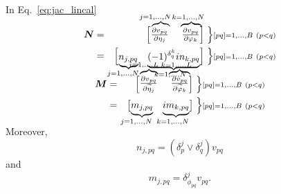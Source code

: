 \documentclass[useAMS,usenatbib]{mn2e}
\newcommand{\bN}{\bmath{N}}
\newcommand{\bM}{\bmath{M}}
\newcommand\coolover[2]{\mathrlap{\smash{\overbrace{\phantom{%
    \begin{matrix} #2 \end{matrix}}}^{\mbox{$#1$}}}}#2}
\newcommand\coolunder[2]{\mathrlap{\smash{\underbrace{\phantom{%
    \begin{matrix} #2 \end{matrix}}}_{\mbox{$#1$}}}}#2}
\newcommand\coolrightbrace[2]{%
\left.\vphantom{\begin{matrix} #1 \end{matrix}}\right\}#2}
\begin{document}
In Eq.~\eqref{eq:jac_lincal} 

\begin{eqnarray}
\bN &=& 
\begin{bmatrix}
\coolover{\!\!\!\!\!\!\!{\scriptstyle j=1,\ldots,N}}{\frac{\partial v_{pq}}{\partial \eta_j}} & \coolover{\!\!\!\!{\scriptstyle k=1,\ldots,N}}{~\frac{\partial v_{pq}}{\partial \varphi_k}}
\end{bmatrix}
\begin{matrix}%
\coolrightbrace{\frac{\partial v_{ij}}{\partial \eta_j}}{\scriptstyle [pq] = 1,\ldots,B~(p<q)}
\end{matrix}\\
&=& \begin{bmatrix}
\coolunder{\!\!\!\!\!\!\!{\scriptstyle j=1,\ldots,N}}{n_{j,pq}} & \coolunder{\!\!\!\!{\scriptstyle k=1,\ldots,N}}{(-1)^{\delta_q^k}i n_{k,pq}}
\end{bmatrix}
\begin{matrix}%
\coolrightbrace{\frac{\partial v_{ij}}{\partial \eta_j}}{\scriptstyle [pq] = 1,\ldots,B~(p<q)}
\end{matrix}\\
\end{eqnarray}

\begin{eqnarray}
\bM &=& 
\begin{bmatrix}
\coolover{\!\!\!\!\!\!\!{\scriptstyle j=1,\ldots,L}}{\frac{\partial v_{pq}}{\partial \widetilde{\eta}_j}} & \coolover{\!\!\!\!{\scriptstyle k=1,\ldots,L}}{~\frac{\partial v_{pq}}{\partial \widetilde{\varphi}_k}}
\end{bmatrix}
\begin{matrix}%
\coolrightbrace{\frac{\partial v_{ij}}{\partial \eta_j}}{\scriptstyle [pq] = 1,\ldots,B~(p<q)}
\end{matrix}\\
&=& \begin{bmatrix}
\coolunder{\!\!\!\!\!\!\!{\scriptstyle j=1,\ldots,N}}{m_{j,pq}} & \coolunder{\!\!\!\!{\scriptstyle k=1,\ldots,N}}{i m_{k,pq}}
\end{bmatrix}
\begin{matrix}%
\coolrightbrace{\frac{\partial v_{ij}}{\partial \eta_j}}{\scriptstyle [pq] = 1,\ldots,B~(p<q)}
\end{matrix}\\
\end{eqnarray}

Moreover,
\begin{equation}
n_{j,pq} = (\delta_{p}^{j}\vee\delta_{q}^{j}) v_{pq} 
\end{equation}
and
\begin{equation}
m_{j,pq} = \delta_{\phi_{pq}}^{j} v_{pq}.
\end{equation}
\end{document}
